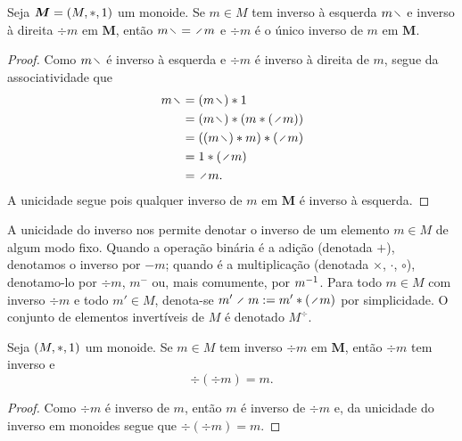 \begin{proposition}
\label{prop:unic.inv}
Seja $\bm M = (M,\ast,1)$ um monoide. Se $m \in M$ tem inverso à esquerda $m \vid$ e inverso à direita $\div m$ em $\bm M$, então $m \vid = \div m$ e $\div m$ é o único inverso de $m$ em $\bm M$.
\end{proposition}
\begin{proof}
Como $m \vid$ é inverso à esquerda e $\div m$ é inverso à direita de $m$, segue da associatividade que
	\begin{align*}
	m \vid &= (m \vid) \opb \id \\
		&= (m \vid) \opb (m \opb (\div m)) \\
		&= ((m \vid) \opb m) \opb (\div m) \\
		&= \id \opb (\div m) \\
		&= \div m.
	\end{align*}
A unicidade segue pois qualquer inverso de $m$ em $\bm M$ é inverso à esquerda.
\end{proof}

\begin{notation}
A unicidade do inverso nos permite denotar o inverso de um elemento $m \in M$ de algum modo fixo. Quando a operação binária é a adição (denotada $+$), denotamos o inverso por $-m$; quando é a multiplicação (denotada $\times$, $\cdot$, $\circ$), denotamo-lo por $\div m$, $m^{-}$ ou, mais comumente, por $m^{-1}$. Para todo $m \in M$ com inverso $\div m$ e todo $m' \in M$, denota-se $m' \div m := m' \opb (\div m)$ por simplicidade. O conjunto de elementos invertíveis de $M$ é denotado $M^{\div}$.
\end{notation}

\begin{proposition}
Seja $(M,\ast,1)$ um monoide. Se $m \in M$ tem inverso $\div m$ em $\bm M$, então $\div m$ tem inverso e
	\begin{equation*}
	\div(\div m) = m.
	\end{equation*}
\end{proposition}
\begin{proof}
Como $\div m$ é inverso de $m$, então $m$ é inverso de $\div m$ e, da unicidade do inverso em monoides segue que $\div(\div m) = m$.
\end{proof}

